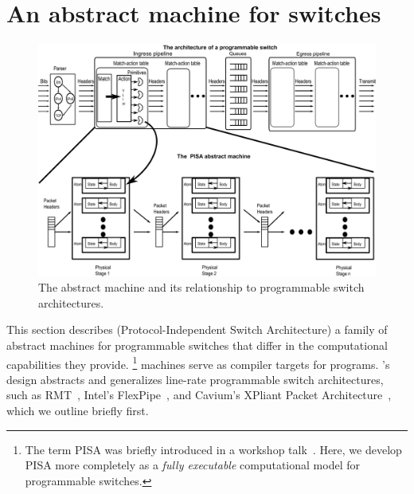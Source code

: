\section{An abstract machine for switches}
\label{s:absmachine}

\begin{figure}[!t]
  \includegraphics[width=\textwidth]{pisa.pdf}
  \caption{The \absmachine abstract machine and its relationship to
  programmable switch architectures.}
  \label{fig:switch}
\end{figure}

This section describes \absmachine (Protocol-Independent Switch Architecture) a
family of abstract machines for programmable switches that differ in the
computational capabilities they provide.  \footnote{The term PISA was briefly
  introduced in a workshop talk~\cite{nick_p4}.  Here, we develop PISA more
completely as a \textit{fully executable} computational model for programmable
switches.} \absmachine machines serve as compiler targets for \pktlanguage
programs.  \absmachine's design abstracts and generalizes line-rate
programmable switch architectures, such as RMT~\cite{rmt}, Intel's
FlexPipe~\cite{flexpipe}, and Cavium's XPliant Packet
Architecture~\cite{xpliant}, which we outline briefly first.

